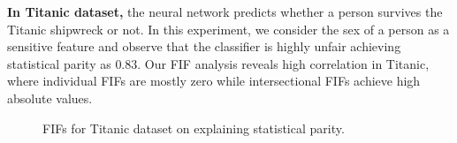 \textbf{In Titanic dataset,} the neural network predicts whether a person survives the Titanic shipwreck or not. In this experiment, we consider the sex of a person as a sensitive feature and observe that the classifier is highly unfair achieving statistical parity as $ 0.83 $. Our FIF analysis reveals high correlation in Titanic, where individual FIFs are mostly zero while intersectional FIFs achieve high absolute values.

\begin{figure}
	\centering
	\hfil
	\caption[FIFs for Titanic dataset]{FIFs for Titanic dataset on explaining statistical parity.}\label{fairness_fairXplainer_fig:individual_vs_intersectional_influence_titanic}
\end{figure}


